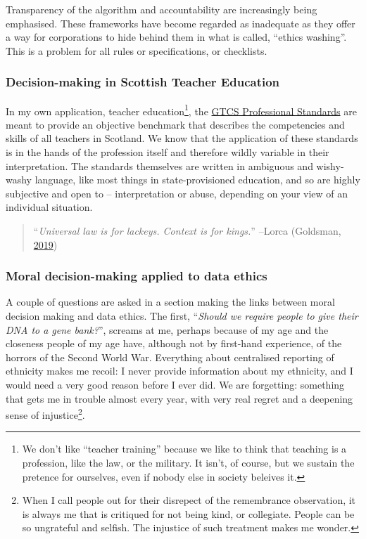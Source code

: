 \documentclass[
]{book}
\begin{document}
Transparency of the algorithm and accountability are increasingly being emphasised. These frameworks have become regarded as inadequate as they offer a way for corporations to hide behind them in what is called, ``ethics washing''. This is a problem for all rules or specifications, or checklists.

\hypertarget{decision-making-in-scottish-teacher-education}{%
\subsubsection{Decision-making in Scottish Teacher Education}\label{decision-making-in-scottish-teacher-education}}

In my own application, teacher education\footnote{We don't like ``teacher training'' because we like to think that teaching is a profession, like the law, or the military. It isn't, of course, but we sustain the pretence for ourselves, even if nobody else in society beleives it.}, the \href{https://www.gtcs.org.uk/professional-standards/standards-for-registration.aspx}{GTCS Professional Standards} are meant to provide an objective benchmark that describes the competencies and skills of all teachers in Scotland. We know that the application of these standards is in the hands of the profession itself and therefore wildly variable in their interpretation. The standards themselves are written in ambiguous and wishy-washy language, like most things in state-provisioned education, and so are highly subjective and open to -- interpretation or abuse, depending on your view of an individual situation.

\begin{quote}
``\emph{Universal law is for lackeys. Context is for kings.}'' --Lorca (Goldsman, \protect\hyperlink{ref-Goldsman2019}{2019})
\end{quote}

\hypertarget{moral-decision-making-applied-to-data-ethics}{%
\subsubsection{Moral decision-making applied to data ethics}\label{moral-decision-making-applied-to-data-ethics}}

A couple of questions are asked in a section making the links between moral decision making and data ethics. The first, ``\emph{Should we require people to give their DNA to a gene bank?}'', screams at me, perhaps because of my age and the closeness people of my age have, although not by first-hand experience, of the horrors of the Second World War. Everything about centralised reporting of ethnicity makes me recoil: I never provide information about my ethnicity, and I would need a very good reason before I ever did. We are forgetting: something that gets me in trouble almost every year, with very real regret and a deepening sense of injustice\footnote{When I call people out for their disrepect of the remembrance observation, it is always me that is critiqued for not being kind, or collegiate. People can be so ungrateful and selfish. The injustice of such treatment makes me wonder.}.
\end{document}
